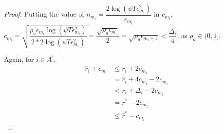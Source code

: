 \begin{proof}
  Putting the value of $n_{m_{i}}=\dfrac{2\log{(\psi T\epsilon_{m_{i}}^{2})}}{\epsilon_{m_{i}}}$ in $c_{m_{i}}$,
  $c_{m_{i}}=\sqrt{\dfrac{\rho_{a}\epsilon_{m_{i}}\log (\psi T\epsilon_{m_{i}}^{2})}{2*2 \log(\psi T\epsilon_{m_{i}}^{2})}}=\dfrac{\sqrt{\rho_{a}\epsilon_{m_{i}}}}{2} = \sqrt{\rho_{a}\epsilon_{m_{i}+1}} < \dfrac{\Delta_{i}}{4} $, as $\rho_{a}\in (0,1]$.
  
  Again, for ${i} \in A^{'}$, 
  \begin{align*}
\hat{r}_{i} + c_{m_{i}}&\leq r_{i} + 2c_{m_{i}} \\
&= \hat{r}_{i} + 4c_{m_{i}} - 2c_{m_{i}} \\
 &< r_{i} + \Delta_{i} - 2c_{m_{i}}\\
 &= r^{*} -2c_{m_{i}} \\
 &\leq \hat{r}^{*} - c_{m_{i}}
  \end{align*}



\end{proof}
